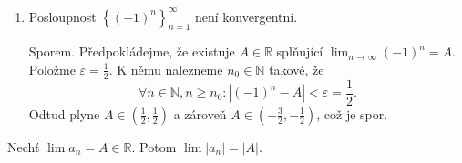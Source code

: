 \begin{priklad}
\begin{enumerate}
		\paragraph{Konstrukce $\left \{ n_k \right \}_{k=1}^\infty $.}
		\begin{itemize}
			\item $k=1$: Položme $n_0 = 1$ a použijme (\ref{limitarovnice}). Nalezneme $n_1 \in \mathbb N $ splňující
			$\left | \sqrt[n_1]{n_1}  -1\right|\geq \varepsilon$.
			\item $k\rightsquigarrow k+1$: Již máme  $n_1 < n_2 < \dots < n_k$. Položme $n_0= n_k+1$ a použijeme (\ref{limitarovnice}).
			Nalezneme $n_{k+1}\in \mathbb N $ splňující $n_{k+1}\geq n_0 > n_k$ a $\left | \sqrt[n_{k+1}]{n_{k+1}}  -1\right|\geq \varepsilon$.
			Pro každé $k\in \mathbb N , k \geq 2$ platí
			\begin{align*}
				\left | \sqrt[n_{k}]{n_{k}}  -1\right|&\geq \varepsilon\\
				\sqrt[n_{k}]{n_{k}}  -1&\geq \varepsilon\\
				n_k  &\geq (1+\varepsilon)^{n_k} \geq 1+ \binom{n_k}{1}\varepsilon + \binom{n_k}{2}\varepsilon^2 \\
				n_k & \geq \binom{n_k}{2}\varepsilon^2 = \frac{1}{2}n_k(n_k-1)\varepsilon^2.
			\end{align*}
			Pro každé $k\in \mathbb N , k \geq 2$ platí
			\begin{align*}
			\frac{2}{\varepsilon^2}&\geq n_k - 1 \\
			\frac{2}{\varepsilon^2} + 1 &\geq n_k \geq k \implies \mathbb N  \textrm{ je shora omezená,}
			\end{align*}
		což je spor.
		\end{itemize}
		\item Posloupnost $\left \{ (-1)^n \right \}_{n=1}^\infty $ není konvergentní.
		\par Sporem. Předpokládejme, že existuje  $A\in \mathbb R $ splňující
		$\lim_{n \to \infty} (-1)^n=A$. Položme $\varepsilon = \frac{1}{2}$. K němu nalezneme $n_0 \in \mathbb N $ takové, že
		$$
		    \forall n \in \mathbb N , n\geq n_0: \left | (-1)^n -A\right | < \varepsilon = \frac{1}{2}.
		$$
		Odtud plyne $A\in \left( \frac{1}{2}, \frac{1}{2} \right ) $ a zároveň $A\in \left( -\frac{3}{2}, -\frac{1}{2} \right ) $,
		což je spor.
	\end{enumerate}
\end{priklad}

\begin{veta} \label{veta2.3}
Nechť $\lim a_n = A \in \mathbb{R}$. Potom $\lim |a_n| = |A|$.
\end{veta}

